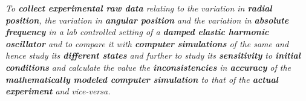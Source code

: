 \textit{To \textbf{collect experimental raw data} relating to the variation in \textbf{radial position}, the variation in \textbf{angular position} and the variation in \textbf{absolute frequency} in a lab controlled setting of a \textbf{damped elastic harmonic oscillator} and to compare it with \textbf{computer simulations} of the same and hence study its \textbf{different states} and further to study its \textbf{sensitivity} to \textbf{initial conditions} and calculate the value the \textbf{inconsistencies} in \textbf{accuracy} of the \textbf{mathematically modeled computer simulation} to that of the \textbf{actual experiment} and vice-versa.}
